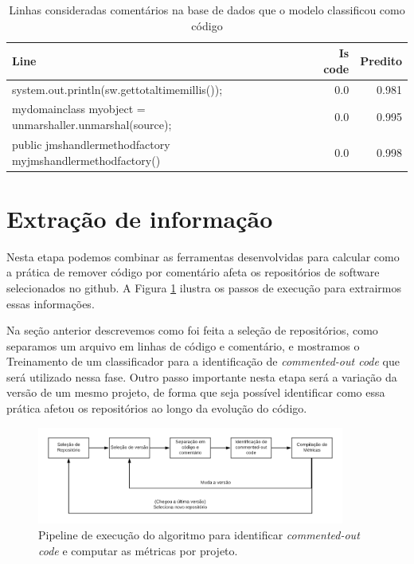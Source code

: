 \documentclass[12pt]{article}
\begin{document}
\begin{table}[H]
  \centering
  \caption{Linhas consideradas comentários na base de dados que o modelo classificou como código}
  \label{tab:commentout}
  \begin{tabular}{lrr}
    Line & Is code & Predito\\[0.5ex]
    \hline
    system.out.println(sw.gettotaltimemillis()); & 0.0 & 0.981\\[0.5ex]
    mydomainclass myobject = unmarshaller.unmarshal(source); & 0.0	& 0.995 \\[0.5ex]
    public jmshandlermethodfactory myjmshandlermethodfactory()  & 0.0 & 0.998 \\[0.5ex]
    \hline
  \end{tabular}
\end{table}


\section{Extração de informação}

Nesta etapa podemos combinar as ferramentas desenvolvidas para calcular como a 
prática de remover código por comentário afeta os repositórios de software selecionados
no github. A Figura \ref{fig:pipe} ilustra os passos de execução para extrairmos essas
informações.

Na seção anterior descrevemos como foi feita a seleção de repositórios, como
separamos um arquivo em linhas de código e comentário, e mostramos o Treinamento
de um classificador para a identificação de \textit{commented-out code} que será 
utilizado nessa fase. Outro passo importante nesta etapa será a variação da versão
de um mesmo projeto, de forma que seja possível identificar como essa prática
afetou os repositórios ao longo da evolução do código.


\begin{figure}[ht]
  \centering
  \includegraphics[width=0.9\textwidth]{../images/pipeline-flow.png}
  \caption{Pipeline de execução do algoritmo para identificar \textit{commented-out code}
    e computar as métricas por projeto. }
  \label{fig:pipe}
\end{figure}
\end{document}
